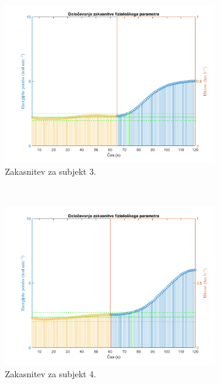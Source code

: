 \begin{figure}[!htbp]
\begin{subfigure}[t]{0.45\columnwidth}
		\label{fig:lag-estimation-2-eem}
	\end{subfigure}
	~
	\begin{subfigure}[t]{0.45\columnwidth}
		\includegraphics[width=\columnwidth]{./Slike/lag-estimation-3-eem.png}
		\caption{Zakasnitev za subjekt 3.}
		\label{fig:lag-estimation-3-eem}
	\end{subfigure}
	~
	\begin{subfigure}[t]{0.45\columnwidth}
		\includegraphics[width=\columnwidth]{./Slike/lag-estimation-4-eem.png}
		\caption{Zakasnitev za subjekt 4.}
		\label{fig:lag-estimation-4-eem}
	\end{subfigure}
	~
	\begin{subfigure}[t]{0.45\columnwidth}

\end{subfigure}
\end{figure}
